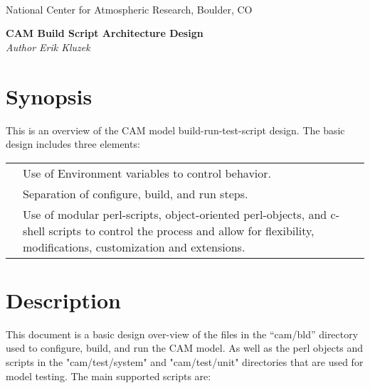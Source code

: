\documentclass[]{article}
\begin{document}

\begin{titlepage}

\begin{latexonly}
 \\
\noindent National Center for Atmospheric Research, Boulder, CO \\
\vspace{2in}
\end{latexonly}

\begin{center}
{\Large\bf CAM Build Script Architecture Design} \\
\medskip
{\it Author Erik Kluzek}
\end{center}

\end{titlepage}

\tableofcontents

\newpage

\section{Synopsis}

This is an overview of the CAM model build-run-test-script design. The basic design includes
three elements:\\

\begin{tabular}{r p{3.7in}}
	& Use of Environment variables to control behavior. \\
	& Separation of configure, build, and run steps. \\
	& Use of modular perl-scripts, object-oriented perl-objects, and c-shell scripts to control 
	the process and allow for flexibility, modifications, customization and extensions. \\
\end{tabular}
		
\section{Description}

This document is a basic design over-view of the files in the
``cam/bld'' directory used to configure, build, and run the CAM model. As well
as the perl objects and scripts  in the "cam/test/system" and "cam/test/unit" 
directories that are used for model testing. The main supported scripts are:
\end{document}
